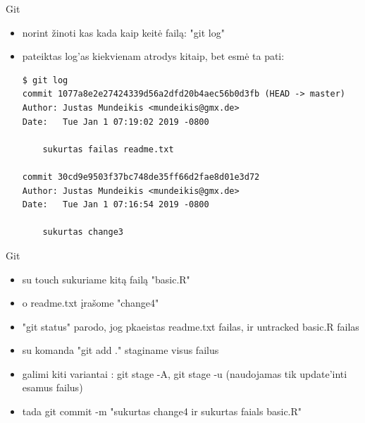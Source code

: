 \documentclass[11pt,xcolor=table]{beamer}
\begin{document}
\begin{frame}[fragile]{Git}
\begin{itemize}
\item norint žinoti kas kada kaip keitė failą: "git log"
\item pateiktas log'as kiekvienam atrodys kitaip, bet esmė ta pati:
\begin{lstlisting}
$ git log
commit 1077a8e2e27424339d56a2dfd20b4aec56b0d3fb (HEAD -> master)
Author: Justas Mundeikis <mundeikis@gmx.de>
Date:   Tue Jan 1 07:19:02 2019 -0800

    sukurtas failas readme.txt

commit 30cd9e9503f37bc748de35ff66d2fae8d01e3d72
Author: Justas Mundeikis <mundeikis@gmx.de>
Date:   Tue Jan 1 07:16:54 2019 -0800

    sukurtas change3

\end{lstlisting}
\end{itemize}
\end{frame}


\begin{frame}[fragile]{Git}
\begin{itemize}
\item su touch sukuriame kitą failą "basic.R"
\item o readme.txt įrašome "change4"
\item "git status" parodo, jog pkaeistas readme.txt failas, ir untracked basic.R failas
\item su komanda "git add ." staginame visus failus
\item galimi kiti variantai : git stage -A, git stage -u (naudojamas tik update'inti esamus failus)
\item tada git commit -m "sukurtas change4 ir sukurtas faials basic.R"
\end{itemize}
\end{frame}
\end{document}
